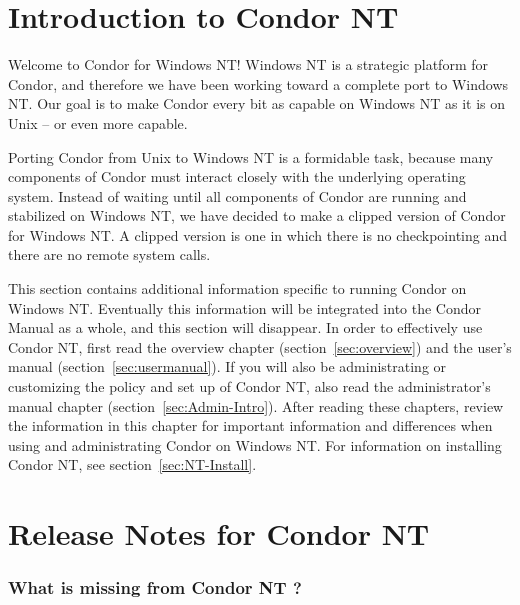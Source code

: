 \section{Introduction to Condor NT \VersionNotice}
Welcome to Condor for Windows NT!  
Windows NT is a strategic platform for Condor,
and therefore we have been working toward a complete
port to Windows NT.
Our goal is to make Condor every bit as capable on Windows NT as it is on
Unix -- or even more capable.  

Porting Condor from Unix to Windows NT is a formidable task,
because many
components of Condor must interact closely with the underlying operating
system.
Instead of waiting until all components of Condor are running
and stabilized on Windows NT,
we have decided to make a clipped version of Condor for Windows NT.
A clipped version is one in which there is no checkpointing
and there are no remote system calls.

This section contains additional information specific to running
Condor on Windows NT.  Eventually this information will be integrated
into the Condor Manual as a whole, and this section will disappear.
In order to effectively use Condor NT, first read the overview
chapter (section~\ref{sec:overview})
and the user's manual (section~\ref{sec:usermanual}).
If you will
also be administrating or customizing the policy and set up of Condor NT,
also read the administrator's manual 
chapter (section~\ref{sec:Admin-Intro}).
After reading these chapters,
review the information in this chapter for
important information and differences when using and administrating
Condor on Windows NT.
For information on installing Condor NT, see
section~\ref{sec:NT-Install}.


\section{Release Notes for Condor NT \VersionNotice}

\subsubsection{What is missing from Condor NT \VersionNotice?}

